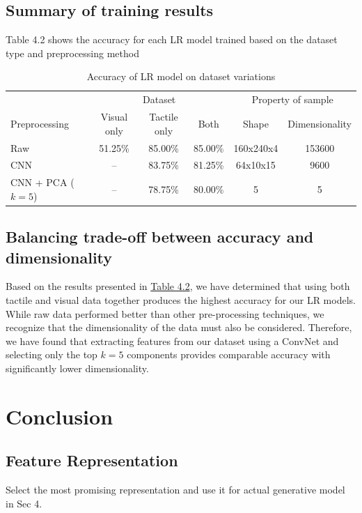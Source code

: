 \documentclass[12pt, a4paper]{report}
\theoremstyle{definition}
\begin{document}
\subsection{Summary of training results}
\label{sec:4.5.1}
Table 4.2 shows the accuracy for each LR model trained based on the dataset type and preprocessing method
\begin{table}[H]
    \centering
    \small
    \begin{tabular}{lccccc}
        \toprule
        & \multicolumn{3}{c}{Dataset} & \multicolumn{2}{c}{Property of sample} \\
        \cmidrule{2-4}\cmidrule{5-6}
        Preprocessing & Visual only & Tactile only & Both & Shape & Dimensionality \\
        \midrule
        Raw & 51.25\% & 85.00\% & 85.00\% & 160x240x4 & 153600 \\
        CNN & -- & 83.75\% & 81.25\% & 64x10x15  & 9600 \\
        CNN + PCA ($k=5$) & -- & 78.75\% & 80.00\% & 5 & 5\\
        \bottomrule
    \end{tabular}
    \caption{Accuracy of LR model on dataset variations}
    \label{tbl:4.2}
\end{table}


\subsection{Balancing trade-off between accuracy and dimensionality}
\label{sec:4.5.2}
Based on the results presented in \hyperref[tbl:4.2]{Table 4.2}, we have determined that using both tactile and visual data together produces the highest accuracy for our LR models. While raw data performed better than other pre-processing techniques, we recognize that the dimensionality of the data must also be considered. Therefore, we have found that extracting features from our dataset using a ConvNet and selecting only the top $k=5$ components provides comparable accuracy with significantly lower dimensionality.


\section{Conclusion}
\label{sec:4.6}


\subsection{Feature Representation}
\label{sec:4.6.1}
Select the most promising representation and use it for actual generative model in Sec 4.
\end{document}
